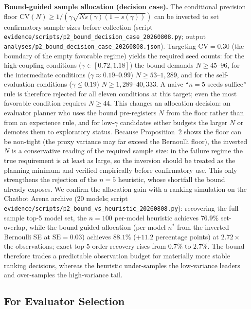 \documentclass[11pt]{article}
\begin{document}
\noindent\textbf{Bound-guided sample allocation (decision case).} The conditional precision floor $\mathrm{CV}(N) \ge 1/(\gamma\sqrt{N s(\gamma)(1-s(\gamma))})$ can be inverted to set confirmatory sample sizes before collection (script \texttt{evidence/scripts/p2\_bound\_decision\_case\_20260808.py}; output \texttt{analyses/p2\_bound\_decision\_case\_20260808.json}). Targeting $\mathrm{CV}{=}0.30$ (the boundary of the empty favorable regime) yields the required seed counts: for the high-coupling conditions ($\gamma \in [0.72, 1.18]$) the bound demands $N \geq 45$--$96$, for the intermediate conditions ($\gamma \approx 0.19$--$0.99$) $N \geq 53$--$1{,}289$, and for the self-evaluation conditions ($\gamma \leq 0.19$) $N \geq 1{,}289$--$40{,}333$. A naive ``$n{=}5$ seeds suffice'' rule is therefore rejected for all eleven conditions at this target; even the most favorable condition requires $N \geq 44$. This changes an allocation decision: an evaluator planner who uses the bound pre-registers $N$ from the floor rather than from an experience rule, and for low-$\gamma$ candidates either budgets the larger $N$ or demotes them to exploratory status. Because Proposition~2 shows the floor can be non-tight (the proxy variance may far exceed the Bernoulli floor), the inverted $N$ is a conservative reading of the required sample size: in the failure regime the true requirement is at least as large, so the inversion should be treated as the planning minimum and verified empirically before confirmatory use. This only strengthens the rejection of the $n{=}5$ heuristic, whose shortfall the bound already exposes. We confirm the allocation gain with a ranking simulation on the Chatbot Arena archive (20 models; script \texttt{evidence/scripts/p2\_bound\_vs\_heuristic\_20260808.py}): recovering the full-sample top-5 model set, the $n{=}100$ per-model heuristic achieves $76.9\%$ set-overlap, while the bound-guided allocation (per-model $n^*$ from the inverted Bernoulli SE at $\mathrm{SE}{=}0.03$) achieves $88.1\%$ ($+11.2$ percentage points) at $2.72\times$ the observations; exact top-5 order recovery rises from $0.7\%$ to $2.7\%$. The bound therefore trades a predictable observation budget for materially more stable ranking decisions, whereas the heuristic under-samples the low-variance leaders and over-samples the high-variance tail.

\subsection{For Evaluator Selection}
\end{document}
